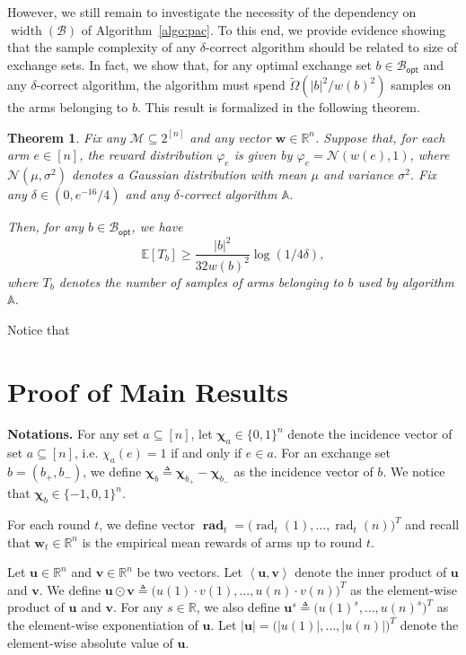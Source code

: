 \documentclass{article}
\newtheorem{theorem}{Theorem}
\newcommand{\Rew}{\varphi}
\newcommand{\E}{\mathbb E}
\newcommand{\M}{\mathcal M}
\newcommand{\B}{\mathcal B}
\newcommand{\RR}{\mathbb R}
\newcommand{\Bopt}{\mathcal B_{\mathsf{opt}}}
\DeclareMathOperator{\rank}{width}
\DeclareMathOperator{\rad}{rad}
\newcommand{\inn}[1]{\left\langle #1 \right\rangle}
\renewcommand{\vec}[1]{\boldsymbol{#1}}
\begin{document}
\begin{spacing}{1.1}
However, we still remain to investigate the necessity of the dependency on $\rank(\B)$ of Algorithm~\ref{algo:pac}.
To this end, we provide evidence showing that the sample complexity of any $\delta$-correct algorithm should be related to size of exchange sets.
In fact, we show that, for any optimal exchange set $b\in\Bopt$ and any $\delta$-correct algorithm, the algorithm  must spend $\tilde \Omega\left(|b|^2/w(b)^2\right)$ samples on the arms belonging to $b$.
This result is formalized in the following theorem.
\begin{theorem}
Fix any $\M\subseteq 2^{[n]}$ and any vector $\vec w \in \RR^n$.
Suppose that, for each arm $e\in [n]$, the reward distribution $\Rew_e$ is given by $\Rew_e=\mathcal N(w(e),1)$, where $\mathcal N(\mu, \sigma^2)$ denotes a Gaussian distribution with mean $\mu$ and variance $\sigma^2$. 
Fix any $\delta \in (0,e^{-16}/4)$
and any $\delta$-correct algorithm $\mathbb A$.

Then, for any $b \in \Bopt$, we have
$$
\E[T_b] \ge \frac{|b|^2}{32w(b)^2}\log(1/4\delta),
$$
where $T_b$ denotes the number of samples of arms belonging to $b$ used by algorithm $\mathbb A$.
\end{theorem}
Notice that 



\section{Proof of Main Results}


\textbf{Notations.} 
For any set $a\subseteq [n]$, let $\vec \chi_a \in \{0,1\}^n$ denote the incidence vector of set $a \subseteq [n]$, i.e. $\chi_a(e) = 1$ if and only if $e\in a$.
For an exchange set $b=(b_+,b_-)$, we define $\vec \chi_b \triangleq \vec \chi_{b_+}- \vec \chi_{b_-}$ as the incidence vector of $b$.
We notice that $\vec \chi_b \in \{-1,0,1\}^n$.

For each round $t$, we define vector $\vec\rad_t = \big(\rad_t(1),\ldots,\rad_t(n)\big)^T$ and recall that $\vec w_t\in \RR^n$ is the empirical mean rewards of arms up to round $t$.

Let $\vec u\in \RR^n$ and $\vec v\in \RR^n$ be two vectors.
Let $\inn{\vec u, \vec v}$ denote the inner product of $\vec u$ and $\vec v$.
We define $\vec u \odot \vec v \triangleq \big(u(1)\cdot v(1),\ldots,u(n)\cdot v(n)\big)^T$ as the element-wise product of $\vec u$ and $\vec v$.
For any $s\in \RR$, we also define $\vec u^s \triangleq \big(u(1)^s, \ldots, u(n)^s)^T$ as the element-wise exponentiation of $\vec u$.
Let $|\vec u| = \big(|u(1)|, \ldots, |u(n)|\big)^T$ denote the element-wise absolute value of $\vec u$.




\end{spacing}
\end{document}
